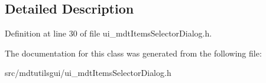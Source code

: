 \subsection{Detailed Description}


Definition at line 30 of file ui\_\-mdtItemsSelectorDialog.h.



The documentation for this class was generated from the following file:\begin{DoxyCompactItemize}
\item 
src/mdtutilsgui/ui\_\-mdtItemsSelectorDialog.h\end{DoxyCompactItemize}
